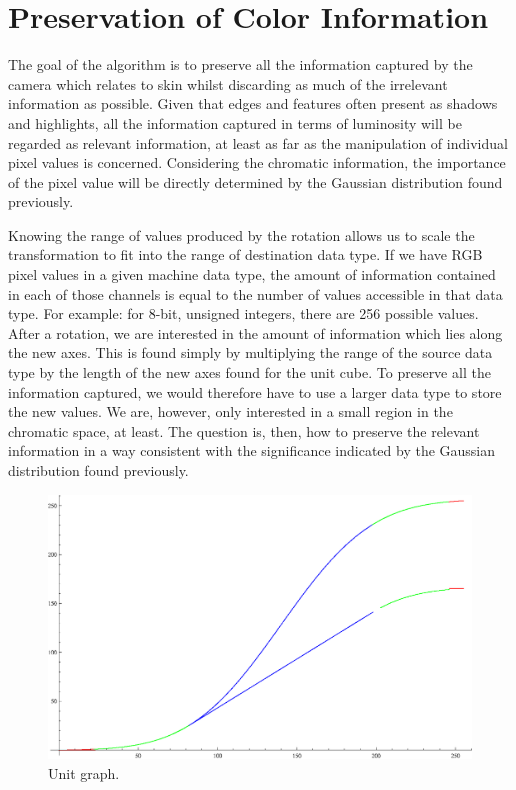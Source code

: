 \section{Preservation of Color Information}\label{sec:PreservationOfColorInformation}

The goal of the algorithm is to preserve all the information captured by the camera which relates to skin whilst discarding as much of the irrelevant information as possible. Given that edges and features often present as shadows and highlights, all the information captured in terms of luminosity will be regarded as relevant information, at least as far as the manipulation of individual pixel values is concerned. Considering the chromatic information, the importance of the pixel value will be directly determined by the Gaussian distribution found previously.

Knowing the range of values produced by the rotation allows us to scale the transformation to fit into the range of destination data type. If we have RGB pixel values in a given machine data type, the amount of information contained in each of those channels is equal to the number of values accessible in that data type. For example: for 8-bit, unsigned integers, there are 256 possible values. After a rotation, we are interested in the amount of information which lies along the new axes. This is found simply by multiplying the range of the source data type by the length of the new axes found for the unit cube. To preserve all the information captured, we would therefore have to use a larger data type to store the new values. We are, however, only interested in a small region in the chromatic space, at least. The question is, then, how to preserve the relevant information in a way consistent with the significance indicated by the Gaussian distribution found previously.





\begin{figure}[h!]
  \caption{Unit graph.}
  \label{fig:UnitGraph}
  \centering
    \includegraphics[width=\textwidth]{Chapter2/Figs/unitGraph.eps}
\end{figure}


